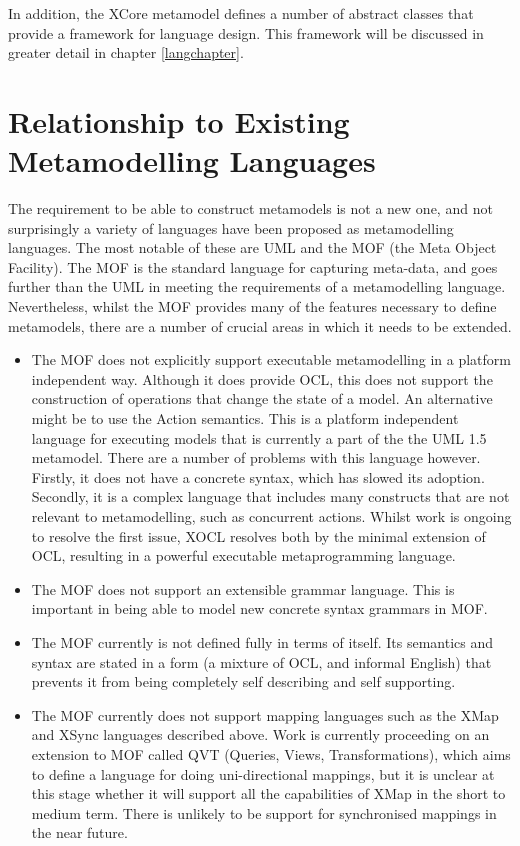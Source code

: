In addition, the XCore metamodel defines a number of abstract
classes that provide a framework for language design. This
framework will be discussed in greater detail in chapter
\ref{langchapter}.

\section{Relationship to Existing Metamodelling Languages}
\label{differences}

The requirement to be able to construct metamodels is not a new
one, and not surprisingly a variety of languages have been
proposed as metamodelling languages. The most notable of these are
UML and the MOF (the Meta Object Facility). The MOF is the
standard language for capturing meta-data, and goes further than
the UML in meeting the requirements of a metamodelling language.
Nevertheless, whilst the MOF provides many of the features
necessary to define metamodels, there are a number of crucial
areas in which it needs to be extended.

\begin{itemize}
\item The MOF does not explicitly support executable metamodelling
in a platform independent way. Although it does provide OCL, this
does not support the construction of operations that change the
state of a model. An alternative might be to use the Action
semantics. This is a platform independent language for executing
models that is currently a part of the the UML 1.5 metamodel.
There are a number of problems with this language however.
Firstly, it does not have a concrete syntax, which has slowed its
adoption. Secondly, it is a complex language that includes many
constructs that are not relevant to metamodelling, such as
concurrent actions. Whilst work is ongoing to resolve the first
issue, XOCL resolves both by the minimal extension of OCL,
resulting in a powerful executable metaprogramming language. \item
The MOF does not support an extensible grammar language. This is
important in being able to model new concrete syntax grammars in
MOF. \item The MOF currently is not defined fully in terms of
itself. Its semantics and syntax are stated in a form (a mixture
of OCL, and informal English) that prevents it from being
completely self describing and self supporting. \item The MOF
currently does not support mapping languages such as the XMap and
XSync languages described above. Work is currently proceeding on
an extension to MOF called QVT (Queries, Views, Transformations),
which aims to define a language for doing uni-directional
mappings, but it is unclear at this stage whether it will support
all the capabilities of XMap in the short to medium term. There is
unlikely to be support for synchronised mappings in the near
future.
\end{itemize}


